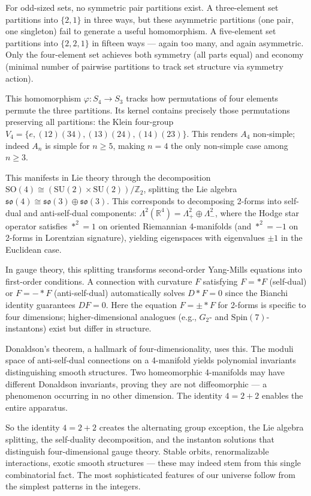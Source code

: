 For odd-sized sets, no symmetric pair partitions exist. A three-element set partitions into $\{2,1\}$ in three ways, but these asymmetric partitions (one pair, one singleton) fail to generate a useful homomorphism. A five-element set partitions into $\{2,2,1\}$ in fifteen ways — again too many, and again asymmetric. Only the four-element set achieves both symmetry (all parts equal) and economy (minimal number of pairwise partitions to track set structure via symmetry action).

This homomorphism $\varphi: S_4 \to S_3$ tracks how permutations of four elements permute the three partitions. Its kernel contains precisely those permutations preserving all partitions: the Klein four-group $V_4 = \{e, (12)(34), (13)(24), (14)(23)\}$. This renders $A_4$ non-simple; indeed $A_n$ is simple for $n\ge 5$, making $n=4$ the only non-simple case among $n\ge 3$.

This manifests in Lie theory through the decomposition $\mathrm{SO}(4) \cong (\mathrm{SU}(2) \times \mathrm{SU}(2))/\mathbb{Z}_2$, splitting the Lie algebra $\mathfrak{so}(4) \cong \mathfrak{so}(3) \oplus \mathfrak{so}(3)$. This corresponds to decomposing 2-forms into self-dual and anti-self-dual components: $\Lambda^2(\mathbb{R}^4) = \Lambda^2_+ \oplus\Lambda^2_-$, where the Hodge star operator satisfies $*^2 = 1$ on oriented Riemannian 4-manifolds (and $*^2 = -1$ on 2-forms in Lorentzian signature), yielding eigenspaces with eigenvalues $\pm 1$ in the Euclidean case.

In gauge theory, this splitting transforms second-order Yang-Mills equations into first-order conditions. A connection with curvature $F$ satisfying $F = *F$ (self-dual) or $F = -*F$ (anti-self-dual) automatically solves $D*F = 0$ since the Bianchi identity guarantees $DF = 0$. Here the equation $F=\pm *F$ for 2-forms is specific to four dimensions; higher-dimensional analogues (e.g., $G_2$- and $\mathrm{Spin}(7)$-instantons) exist but differ in structure.

Donaldson's theorem, a hallmark of four-dimensionality, uses this. The moduli space of anti-self-dual connections on a 4-manifold yields polynomial invariants distinguishing smooth structures. Two homeomorphic 4-manifolds may have different Donaldson invariants, proving they are not diffeomorphic — a phenomenon occurring in no other dimension. The identity $4 = 2 + 2$ enables the entire apparatus.

So the identity $4 = 2 + 2$ creates the alternating group exception, the Lie algebra splitting, the self-duality decomposition, and the instanton solutions that distinguish four-dimensional gauge theory. Stable orbits, renormalizable interactions, exotic smooth structures — these may indeed stem from this single combinatorial fact. The most sophisticated features of our universe follow from the simplest patterns in the integers.

